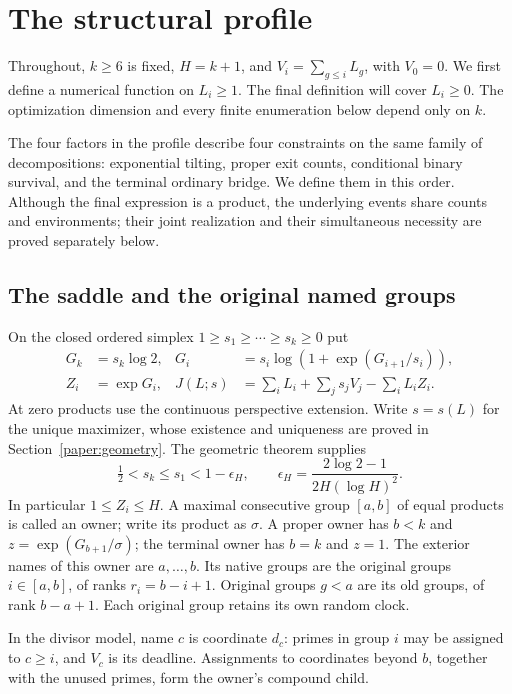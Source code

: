 \section{The structural profile}
\label{profile:definition}

Throughout, $k\geq6$ is fixed, $H=k+1$, and $V_i=\sum_{g\leq i}L_g$,
with $V_0=0$. We first define a numerical function on $L_i\geq1$.
The final definition will cover $L_i\geq0$. The optimization dimension
and every finite enumeration below depend only on $k$.

The four factors in the profile describe four constraints on the same
family of decompositions: exponential tilting, proper exit counts,
conditional binary survival, and the terminal ordinary bridge. We define
them in this order. Although the final expression is a product, the
underlying events share counts and environments; their joint realization
and their simultaneous necessity are proved separately below.

\subsection{The saddle and the original named groups}
On the closed ordered simplex $1\geq s_1\geq\cdots\geq s_k\geq0$ put
\begin{align}
 G_k&=s_k\log2,&
 G_i&=s_i\log(1+\exp(G_{i+1}/s_i)),\\
 Z_i&=\exp G_i,&
 J(L;s)&=\sum_i L_i+\sum_j s_jV_j-\sum_i L_iZ_i.
 \label{profile:saddle}
\end{align}
At zero products use the continuous perspective extension. Write $s=s(L)$ for the
unique maximizer, whose existence and uniqueness are proved in
Section~\ref{paper:geometry}. The geometric theorem supplies
\begin{equation}
 \tfrac12<s_k\leq s_1<1-\epsilon_H,
 \qquad \epsilon_H=\frac{2\log2-1}{2H(\log H)^2}.
 \label{profile:compact}
\end{equation}
In particular $1\leq Z_i\leq H$. A maximal consecutive group
$[a,b]$ of equal products is called an owner; write its product as
$\sigma$. A proper owner has $b<k$ and
$z=\exp(G_{b+1}/\sigma)$; the terminal owner has $b=k$ and $z=1$.
The exterior names of this owner are $a,\ldots,b$. Its native groups
are the original groups $i\in[a,b]$, of ranks $r_i=b-i+1$.
Original groups $g<a$ are its old groups, of rank $b-a+1$.
Each original group retains its own random clock.

In the divisor model, name $c$ is coordinate $d_c$: primes in group $i$
may be assigned to $c\geq i$, and $V_c$ is its deadline. Assignments to
coordinates beyond $b$, together with the unused primes, form the
owner's compound child.

